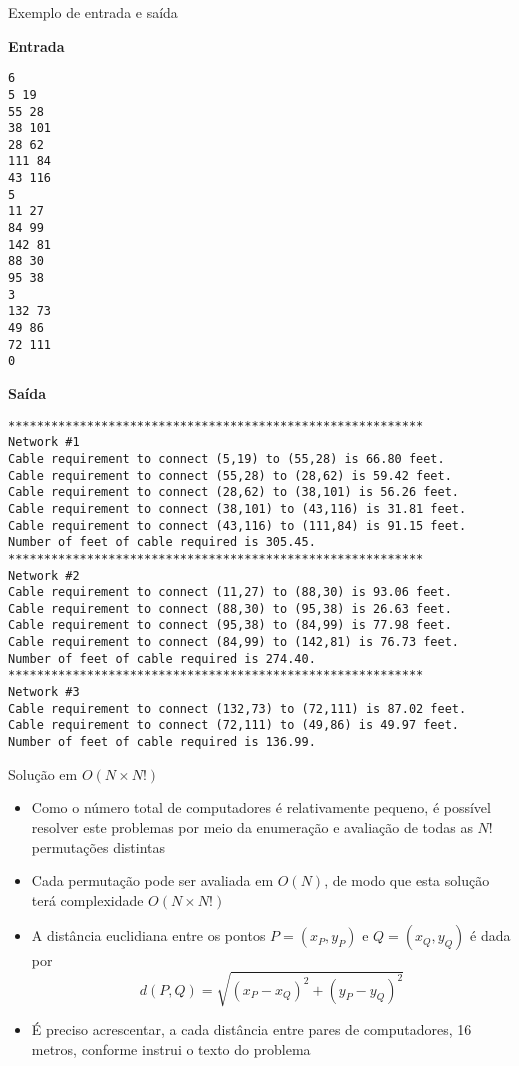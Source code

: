 \begin{frame}[fragile]{Exemplo de entrada e saída}

\begin{scriptsize}
\begin{minipage}[t]{0.35\textwidth}
\textbf{Entrada}
\begin{verbatim}
6
5 19
55 28
38 101
28 62
111 84
43 116
5
11 27
84 99
142 81
88 30
95 38
3
132 73
49 86
72 111
0
\end{verbatim}
\end{minipage}
\begin{minipage}[t]{0.6\textwidth}
\textbf{Saída}
\begin{verbatim}
**********************************************************
Network #1
Cable requirement to connect (5,19) to (55,28) is 66.80 feet.
Cable requirement to connect (55,28) to (28,62) is 59.42 feet.
Cable requirement to connect (28,62) to (38,101) is 56.26 feet.
Cable requirement to connect (38,101) to (43,116) is 31.81 feet.
Cable requirement to connect (43,116) to (111,84) is 91.15 feet.
Number of feet of cable required is 305.45.
**********************************************************
Network #2
Cable requirement to connect (11,27) to (88,30) is 93.06 feet.
Cable requirement to connect (88,30) to (95,38) is 26.63 feet.
Cable requirement to connect (95,38) to (84,99) is 77.98 feet.
Cable requirement to connect (84,99) to (142,81) is 76.73 feet.
Number of feet of cable required is 274.40.
**********************************************************
Network #3
Cable requirement to connect (132,73) to (72,111) is 87.02 feet.
Cable requirement to connect (72,111) to (49,86) is 49.97 feet.
Number of feet of cable required is 136.99.
\end{verbatim}
\end{minipage}
\end{scriptsize}

\end{frame}


\begin{frame}[fragile]{Solução em $O(N\times N!)$ }

    \begin{itemize}
        \item Como o número total de computadores é relativamente pequeno, é possível
            resolver este problemas por meio da enumeração e avaliação de todas as $N!$
            permutações distintas

        \item Cada permutação pode ser avaliada em $O(N)$, de modo que esta solução terá 
            complexidade $O(N\times N!)$

        \item A distância euclidiana entre os pontos $P = (x_P, y_P)$ e $Q = (x_Q, y_Q)$ é dada
            por
        $$
            d(P, Q) = \sqrt{(x_P - x_Q)^2 + (y_P - y_Q)^2}
        $$

        \item É preciso acrescentar, a cada distância entre pares de computadores, 16 metros,
            conforme instrui o texto do problema
    \end{itemize}

\end{frame}

